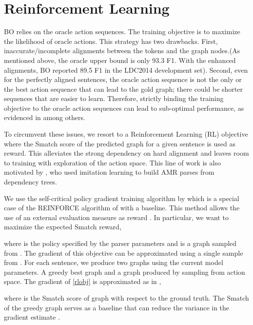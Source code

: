 \documentclass[11pt,a4paper]{article}
\begin{document}
\section{Reinforcement Learning}

BO relies on the oracle action sequences. The training objective is to maximize the likelihood of oracle actions. This strategy has two drawbacks. First, inaccurate/incomplete alignments between the tokens and the graph nodes.(As mentioned above, the oracle upper bound is only 93.3 F1. With the enhanced alignments, BO reported 89.5 F1 in the LDC2014 development set). Second, even for the perfectly aligned sentences, the oracle action sequence is not the only or the best action sequence that can lead to the gold graph; there could be shorter sequences that are easier to learn. Therefore, strictly binding the training objective to the oracle action sequences can lead to sub-optimal performance, as evidenced in \cite{daume05,daume09,goldberg12coling,goldberg2013training,D16-1211} among others.  

To circumvent these issues, we resort to a Reinforcement Learning (RL) objective where the Smatch score of the predicted graph for a given sentence is used as reward. This alleviates the strong dependency on hard alignment and leaves room to training with exploration of the action space. This line of work is also motivated by , who used imitation learning to build AMR parses from dependency trees.

We use the self-critical policy gradient training algorithm by  which is a special case of the REINFORCE algorithm of  with a baseline. This method allows the use of an external evaluation measure as reward \cite{paulus2017deep}. In particular, we want to maximize the expected Smatch reward,



where  is the policy specified by the parser parameters  and  is a graph sampled from . The gradient of this objective can be approximated using a single sample from . For each sentence, we produce two graphs using the current model parameters. A greedy best graph  and a graph  produced by sampling from action space. The gradient of \ref{rlobj} is approximated as in \cite{rennie2017self},



where  is the Smatch score of graph  with respect to the ground truth. The Smatch of the greedy graph  serves as a baseline that can reduce the variance in the gradient estimate \cite{williams1992simple}. 
\end{document}

